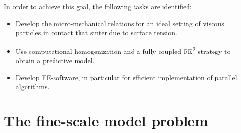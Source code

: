 \documentclass[MikaelDissertation.tex]{subfiles}
\begin{document}
In order to achieve this goal, the following tasks are identified:
\begin{itemize}
 \item Develop the micro-mechanical relations for an ideal setting of viscous particles in contact that sinter due to surface tension.
 \item Use computational homogenization and a fully coupled FE\textsuperscript{2} strategy to obtain a predictive model.
 \item Develop FE-software, in particular for efficient implementation of parallel algorithms.
\end{itemize}

\chapter{The fine-scale model problem}
\end{document}
